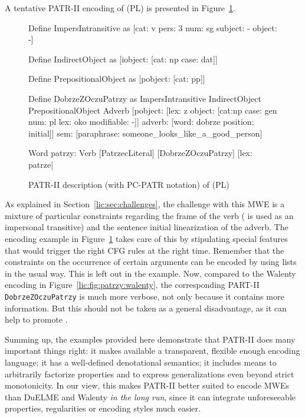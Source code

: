 \documentclass[output=paper]{langsci/langscibook}
\begin{document}
A tentative PATR-II encoding of (PL)  is presented in Figure~\ref{lic:fig:patr:polish}.
\begin{figure}[p]
  \begin{patr-listing}
Define ImpersIntransitive as
    [cat: v
     pers: 3 
     num: sg
     subject: -
     object: -]

Define IndirectObject as
    [iobject: [cat: np
               case: dat]]

Define PrepositionalObject as
    [pobject: [cat: pp]]
    
Define DobrzeZOczuPatrzy as
    ImpersIntransitive
    IndirectObject
    PrepositionalObject
    Adverb
    [pobject: [lex: z
               object: [cat:np
                        case: gen
                        num: pl
                        lex: oko
                        modifiable: -]]
     adverb: [word: dobrze
              position: initial]]
     sem: [paraphrase: someone_looks_like_a_good_person]
    
Word patrzy:
    Verb
    {[PatrzecLiteral] [DobrzeZOczuPatrzy]}
    [lex: patrze|%
  \end{patr-listing}
  \caption{PATR-II description (with PC-PATR notation) of (PL) }
  \label{lic:fig:patr:polish}
\end{figure}
As explained in Section~\ref{lic:sec:challenges}, the challenge with this MWE is a mixture of particular constraints regarding the  frame of the verb ( is used as an impersonal transitive) and the sentence initial linearization of the adverb. The encoding example in Figure~\ref{lic:fig:patr:polish} takes care of this by stipulating special features that would trigger the right CFG rules at the right time. Remember that the constraints on the occurrence of certain arguments can be encoded by using  lists in the usual way. This is left out in the example. Now, compared to the  Walenty encoding in Figure~\ref{lic:fig:patrzy:walenty}, the corresponding PART-II  \texttt{DobrzeZOczuPatrzy} is much more verbose, not only because it contains more information. But this should not be taken as a general disadvantage, as it can help to promote .  

Summing up, the examples provided here demonstrate that PATR-II does many important things right: it makes available a transparent, flexible enough encoding language; it has a well-defined denotational semantics; it includes means to arbitrarily factorize properties and to express generalizations even beyond strict monotonicity. In our view, this makes PATR-II better suited to encode MWEs than DuELME and Walenty \textit{in the long run}, since it can integrate unforeseeable properties, regularities or encoding styles much easier.
\end{document}
